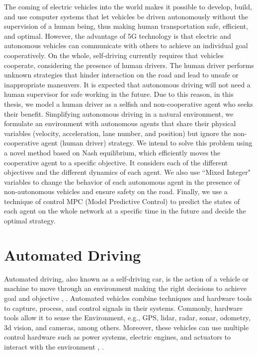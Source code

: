 The coming of electric vehicles into the world makes it possible to develop, build, and use computer systems that let vehicles be driven autonomously without the supervision of a human being, thus making human transportation safe, efficient, and optimal. However, the advantage of 5G technology is that electric and autonomous vehicles can communicate with others to achieve an individual goal cooperatively. On the whole, self-driving currently requires that vehicles cooperate,  considering the presence of human drivers. The human driver performs unknown strategies that hinder interaction on the road and lead to unsafe or inappropriate maneuvers. It is expected that autonomous driving will not need a human supervisor for safe working in the future. Due to this reason, in this thesis, we model a human driver as a selfish and non-cooperative agent who seeks their benefit. Simplifying autonomous driving in a natural environment, we formulate an environment with autonomous agents that share their physical variables (velocity, acceleration, lane number, and position) but ignore the non-cooperative agent (human driver) strategy. We intend to solve this problem using a novel method based on Nash equilibrium, which efficiently moves the cooperative agent to a specific objective. It considers each of the different objectives and the different dynamics of each agent. We also use ``Mixed Integer" variables to change the behavior of each autonomous agent in the presence of non-autonomous vehicles and ensure safety on the road. Finally, we use a technique of control MPC (Model Predictive Control) to predict the states of each agent on the whole network at a specific time in the future and decide the optimal strategy.\\
\section{Automated Driving}

Automated driving, also known as a self-driving car, is the action of a vehicle or machine to move through an environment making the right decisions to achieve goal and objective \cite{Taeihagh_2018}, \cite{Thrun2010TowardRC}. Automated vehicles combine techniques and hardware tools to capture, process, and control signals in their systems. Commonly, hardware tools allow it to sense the  Environment, e.g., GPS, lidar, radar, sonar, odometry, 3d vision, and cameras, among others. Moreover, these vehicles can use multiple control hardware such as power systems, electric engines, and actuators to interact with the environment  \cite{8957499}, \cite{811692}.
\\

